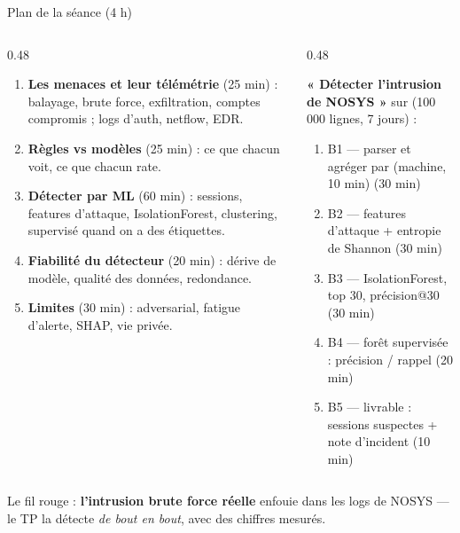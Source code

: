 \begin{frame}{Plan de la séance (4 h)}
\begin{columns}[t]
\begin{column}{0.48\textwidth}
\begin{kbox}
\begin{enumerate}
\item \textbf{Les menaces et leur télémétrie} (25 min) : balayage, brute force,
exfiltration, comptes compromis ; logs d'auth, netflow, EDR.
\item \textbf{Règles vs modèles} (25 min) : ce que chacun voit, ce que
chacun rate.
\item \textbf{Détecter par ML} (60 min) : sessions, features d'attaque,
IsolationForest, clustering, supervisé quand on a des étiquettes.
\item \textbf{Fiabilité du détecteur} (20 min) : dérive de modèle, qualité des
données, redondance.
\item \textbf{Limites} (30 min) : adversarial, fatigue d'alerte, SHAP, vie privée.
\end{enumerate}
\end{kbox}
\end{column}
\begin{column}{0.48\textwidth}
\begin{ebox}
\textbf{« Détecter l'intrusion de NOSYS »} sur 
(100\,000 lignes, 7 jours) :
\begin{enumerate}
\item B1 --- parser et agréger par (machine, 10 min) (30 min)
\item B2 --- features d'attaque + entropie de Shannon (30 min)
\item B3 --- IsolationForest, top 30, précision@30 (30 min)
\item B4 --- forêt supervisée : précision / rappel (20 min)
\item B5 --- livrable : sessions suspectes + note d'incident (10 min)
\end{enumerate}
\end{ebox}
\end{column}
\end{columns}
\vspace{1mm}
\begin{center}\small
Le fil rouge : \textbf{l'intrusion brute force réelle} enfouie dans les logs
de NOSYS --- le TP la détecte \emph{de bout en bout}, avec des chiffres mesurés.
\end{center}
\end{frame}


